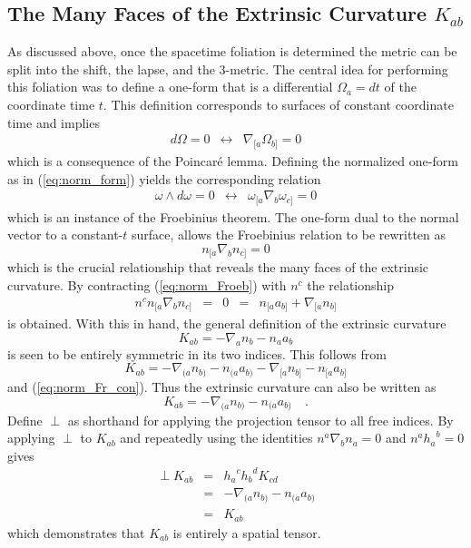 \documentclass[twocolumn]{article}
\def\.{{\quad .}}
\begin{document}
\subsection{The Many Faces of the Extrinsic Curvature $K_{ab}$}\label{S:K_faces}

As discussed above, once the spacetime foliation is determined the metric can
be split into the shift, the lapse, and the 3-metric.  The central idea for
performing this foliation was to define a one-form that is a differential
$\Omega_a = dt$ of the coordinate time $t$.  This definition corresponds to
surfaces of constant coordinate time and implies
\[
  \begin{array}{ccc}
    d \Omega = 0 & \leftrightarrow & \nabla_{[a} \Omega_{b]} = 0
  \end{array}
\]
which is a consequence of the Poincar\'{e} lemma.  Defining the normalized
one-form as in (\ref{eq:norm_form}) yields the corresponding relation
\[
  \begin{array}{ccc}
    \omega \wedge d \omega = 0 & \leftrightarrow & \omega_{[a}
    \nabla_{b} \omega_{c]} = 0
  \end{array}
\]
which is an instance of the Froebinius theorem.  The one-form dual to the
normal vector to a constant-$t$ surface, allows the Froebinius relation
to be rewritten as
\begin{equation}\label{eq:norm_Froeb}
  n_{[a} \nabla_{b} n_{c]} = 0
\end{equation}
which is the crucial relationship that reveals the many faces of the
extrinsic curvature.  By contracting (\ref{eq:norm_Froeb}) with $n^c$ the
relationship
\begin{equation}\label{eq:norm_Fr_con}
 \begin{array}{ccccc}
  n^c n_{[a} \nabla_{b} n_{c]} & = & 0 & = & n_{[a} a_{b]} + \nabla_{[a} n_{b]}
 \end{array}
\end{equation}
is obtained.  With this in hand, the general definition of the extrinsic
curvature
\[
   K_{ab} = -\nabla_{a} n_{b} - n_{a} a_{b}
\]
is seen to be entirely symmetric in its two indices.  This follows from
\[
   K_{ab} = -\nabla_{(a} n_{b)} - n_{(a} a_{b)} -\nabla_{[a} n_{b]} - n_{[a} a_{b]}
\]
and (\ref{eq:norm_Fr_con}).  Thus the extrinsic curvature can also be written as
\[
   K_{ab}  =  -\nabla_{(a} n_{b)} - n_{(a}a_{b)} \.
\]
Define $\perp$ as shorthand for applying the projection tensor to all free
indices.  By applying $\perp$ to $K_{ab}$ and repeatedly using the identities
$n^a \nabla_b n_a = 0$ and $n^a {h_a}^b = 0$gives
\begin{eqnarray*}
   \perp K_{ab} & = & {h_a}^c {h_b}^d K_{cd} \\
                & = & -\nabla_{(a} n_{b)} - n_{(a} a_{b)} \\
                & = & K_{ab}
\end{eqnarray*}
which demonstrates that $K_{ab}$ is entirely a spatial tensor.
\end{document}
